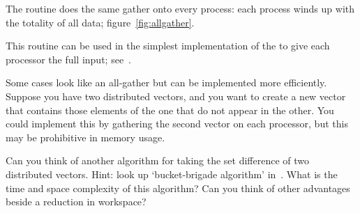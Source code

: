 The  routine does the same gather onto
every process: each process winds up with the totality of all data;
figure~\ref{fig:allgather}.
%

This routine can be used in the simplest implementation of the 
%
 to give each processor the
full input; see~.

Some cases look like an all-gather but can be implemented more
efficiently. Suppose you have two distributed vectors, and you want to
create a new vector that contains those elements of the one that do
not appear in the other. You could implement this by gathering the
second vector on each processor, but this may be prohibitive in memory
usage.

\begin{exercise}
  Can you think of another algorithm for taking the set difference of
  two distributed vectors. Hint: look up `bucket-brigade algorithm'
  in~\cite{Eijkhout:IHPSClulu}. What is the time and space complexity
  of this algorithm? Can you think of other advantages beside a
  reduction in workspace?
\end{exercise}
